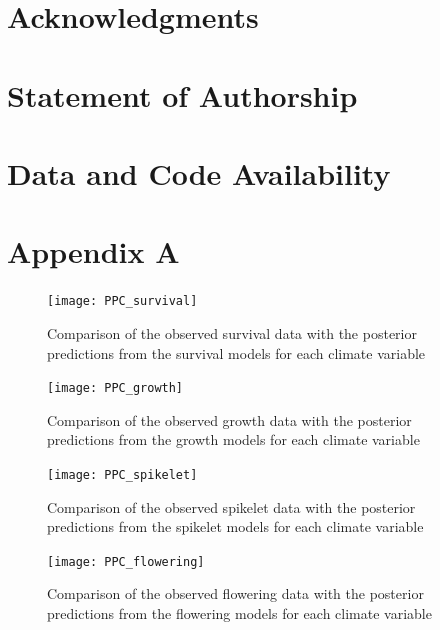 \documentclass[11pt]{article}
\begin{document}
\section*{Acknowledgments}



\section*{Statement of Authorship}

\section*{Data and Code Availability}
\newpage{}	
\section*{Appendix A}
\renewcommand{\thefigure}{A\arabic{figure}}
\setcounter{figure}{0}
	
\renewcommand{\thetable}{A\arabic{table}}
\setcounter{equation}{0}  %
\setcounter{figure}{0}
\setcounter{table}{0}

\begin{figure}[h!]
\texttt{[image: PPC\_survival]}
\caption{Comparison of the observed survival data with the posterior predictions from the survival models for each climate variable}
\label{sup:ppc_surv}
\end{figure}
\clearpage

\begin{figure}[h!]
\texttt{[image: PPC\_growth]}
\caption{Comparison of the observed growth data with the posterior predictions from the growth models for each climate variable}
\label{sup:ppc_growth}
\end{figure}
\clearpage

\begin{figure}[h!]
\texttt{[image: PPC\_spikelet]}
\caption{Comparison of the observed spikelet data with the posterior predictions from the spikelet models for each climate variable}
\label{sup:ppc_spikelet}
\end{figure}
\clearpage

\begin{figure}[h!]
\texttt{[image: PPC\_flowering]}
\caption{Comparison of the observed  flowering data with the posterior predictions from the flowering  models for each climate variable}
\label{sup:ppc_flowering}
\end{figure}
\clearpage
\end{document}
